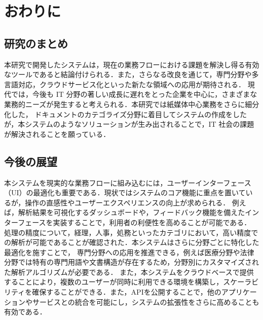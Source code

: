 \chapter{おわりに}
\label{ch:con}

\quad

\section{研究のまとめ}
\label{sec:con_fin}

本研究で開発したシステムは，現在の業務フローにおける課題を解決し得る有効なツールであると結論付けられる．また，さらなる改良を通じて，専門分野や多言語対応，クラウドサービス化といった新たな領域への応用が期待される．
現代では，今後も IT 分野の著しい成長に遅れをとった企業を中心に，さまざまな業務的ニーズが発生すると考えられる．本研究では紙媒体中心業務をさらに細分化した，
ドキュメントのカテゴライズ分野に着目してシステムの作成をしたが，本システムのようなソリューションが生み出されることで，IT 社会の課題が解決されることを願っている．

\section{今後の展望}
\label{sec:con_future}

本システムを現実的な業務フローに組み込むには，ユーザーインターフェース（UI）の最適化も重要である．現状ではシステムのコア機能に重点を置いているが，操作の直感性やユーザーエクスペリエンスの向上が求められる．
例えば，解析結果を可視化するダッシュボードや，フィードバック機能を備えたインターフェースを実装することで，利用者の利便性を高めることが可能である．
処理の精度について，経理，人事，処務といったカテゴリにおいて，高い精度での解析が可能であることが確認された．本システムはさらに分野ごとに特化した最適化を施すことで，
専門分野への応用を推進できる，例えば医療分野や法律分野では特有の専門用語や文書構造が存在するため，分野別にカスタマイズされた解析アルゴリズムが必要である．
また，本システムをクラウドベースで提供することにより，複数のユーザーが同時に利用できる環境を構築し，スケーラビリティを確保することができる．また，APIを公開することで，他のアプリケーションやサービスとの統合を可能にし，システムの拡張性をさらに高めることも有効である．
